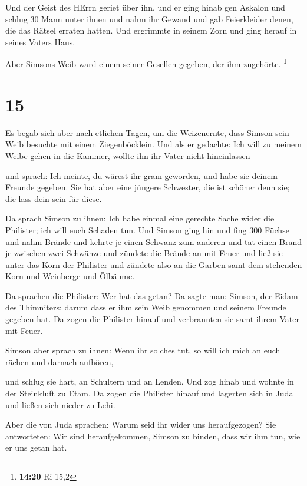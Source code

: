  Und der Geist des HErrn geriet über ihn, und er ging hinab
gen Askalon und schlug 30 Mann unter ihnen und nahm ihr Gewand und gab
Feierkleider denen, die das Rätsel erraten hatten. Und ergrimmte in
seinem Zorn und ging herauf in seines Vaters Haus.

 Aber Simsons Weib ward einem seiner Gesellen gegeben, der
ihm zugehörte. \footnote{\textbf{14:20} Ri 15,2}

\hypertarget{section-6}{%
\section{15}\label{section-6}}

 Es begab sich aber nach etlichen Tagen, um die Weizenernte,
dass Simson sein Weib besuchte mit einem Ziegenböcklein. Und als er
gedachte: Ich will zu meinem Weibe gehen in die Kammer, wollte ihn ihr
Vater nicht hineinlassen

 und sprach: Ich meinte, du wärest ihr gram geworden, und
habe sie deinem Freunde gegeben. Sie hat aber eine jüngere Schwester,
die ist schöner denn sie; die lass dein sein für diese.

 Da sprach Simson zu ihnen: Ich habe einmal eine gerechte
Sache wider die Philister; ich will euch Schaden tun.  Und
Simson ging hin und fing 300 Füchse und nahm Brände und kehrte je einen
Schwanz zum anderen und tat einen Brand je zwischen zwei Schwänze
 und zündete die Brände an mit Feuer und ließ sie unter das
Korn der Philister und zündete also an die Garben samt dem stehenden
Korn und Weinberge und Ölbäume.

 Da sprachen die Philister: Wer hat das getan? Da sagte man:
Simson, der Eidam des Thimniters; darum dass er ihm sein Weib genommen
und seinem Freunde gegeben hat. Da zogen die Philister hinauf und
verbrannten sie samt ihrem Vater mit Feuer.

 Simson aber sprach zu ihnen: Wenn ihr solches tut, so will
ich mich an euch rächen und darnach aufhören, --

 und schlug sie hart, an Schultern und an Lenden. Und zog
hinab und wohnte in der Steinkluft zu Etam.  Da zogen die
Philister hinauf und lagerten sich in Juda und ließen sich nieder zu
Lehi.

 Aber die von Juda sprachen: Warum seid ihr wider uns
heraufgezogen? Sie antworteten: Wir sind heraufgekommen, Simson zu
binden, dass wir ihm tun, wie er uns getan hat.

